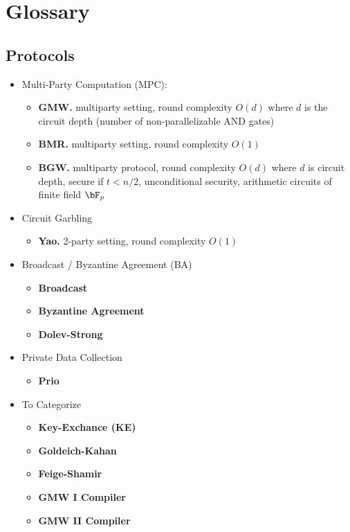 \section{Glossary}

\subsection{Protocols}

\begin{itemize}

\item Multi-Party Computation (MPC):
\begin{itemize}
\item \textbf{GMW.}
    multiparty setting,
    round complexity $O(d)$ where $d$ is the circuit depth (number of non-parallelizable AND gates)
\item \textbf{BMR.}
    multiparty setting,
    round complexity $O(1)$
\item \textbf{BGW.}
    multiparty protocol,
    round complexity $O(d)$ where $d$ is circuit depth,
    secure if $t < n/2$,
    unconditional security,
    arithmetic circuits of finite field $\bF_p$
\end{itemize}

\item Circuit Garbling
\begin{itemize}
\item \textbf{Yao.}
    2-party setting,
    round complexity $O(1)$
\end{itemize}

\item Broadcast / Byzantine Agreement (BA)
\begin{itemize}
\item \textbf{Broadcast}
\item \textbf{Byzantine Agreement}
\item \textbf{Dolev-Strong}
\end{itemize}

\item Private Data Collection
\begin{itemize}
\item \textbf{Prio}
\end{itemize}

\item To Categorize
\begin{itemize}
\item \textbf{Key-Exchance (KE)}
\item \textbf{Goldeich-Kahan}
\item \textbf{Feige-Shamir}
\item \textbf{GMW I Compiler}
\item \textbf{GMW II Compiler}

\end{itemize}

\end{itemize}
